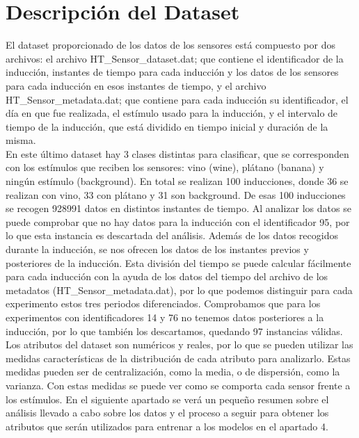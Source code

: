 \documentclass{esannV2}
\begin{document}
\section{Descripción del Dataset}
El dataset proporcionado de los datos de los sensores está compuesto por dos archivos: el archivo HT\_Sensor\_dataset.dat; que contiene el identificador de la inducción, instantes de tiempo para cada inducción y los datos de los sensores para cada inducción en esos instantes de tiempo, y el archivo HT\_Sensor\_metadata.dat; que contiene para cada inducción su identificador, el día en que fue realizada, el estímulo usado para la inducción, y el intervalo de tiempo de la inducción, que está dividido en tiempo inicial y duración de la misma. \\
En este último dataset hay 3 clases distintas para clasificar, que se corresponden con los estímulos que reciben los sensores:  vino (wine), plátano (banana) y ningún estímulo (background). En total se realizan 100 inducciones, donde  36 se realizan con vino, 33 con plátano y 31 son background. De esas 100 inducciones se recogen 928991 datos en distintos instantes de tiempo. Al analizar los datos se puede comprobar que no hay datos para la inducción con el identificador 95, por lo que esta instancia es descartada del análisis. Además de los datos recogidos durante la inducción, se nos ofrecen los datos de los instantes previos y posteriores de la inducción. Esta división del tiempo se puede calcular fácilmente para cada inducción con la ayuda de los datos del tiempo del archivo de los metadatos (HT\_Sensor\_metadata.dat), por lo que podemos distinguir para cada experimento estos tres periodos diferenciados. Comprobamos que para los experimentos con identificadores 14 y 76 no tenemos datos posteriores a la inducción, por lo que también los descartamos, quedando 97 instancias válidas. \\
Los atributos del dataset son numéricos y reales, por lo que se pueden utilizar las medidas características de la distribución de cada atributo para analizarlo. Estas medidas pueden ser de centralización, como la media, o de dispersión, como la varianza. Con estas medidas se puede ver como se comporta cada sensor frente a los estímulos. En el siguiente apartado se verá un pequeño resumen sobre el  análisis llevado a cabo sobre los datos y el proceso a seguir para obtener los atributos que serán utilizados para entrenar a los modelos en el apartado 4.
\end{document}
